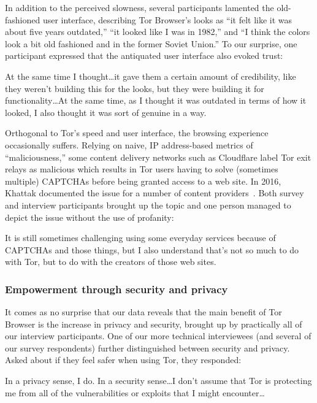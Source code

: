 In addition to the perceived slowness, several participants lamented the
old-fashioned user interface, describing Tor Browser's looks as ``it felt like
it was about five years outdated,'' ``it looked like I was in 1982,'' and ``I
think the colors look a bit old fashioned and in the former Soviet Union.'' To
our surprise, one participant expressed that the antiquated user interface also
evoked trust:

\begin{displayquote}[P02]
At the same time I thought\ldots it gave them a certain amount of credibility,
like they weren't building this for the looks, but they were building it for
functionality\ldots  At the same time, as I thought it was outdated in terms of
how it looked, I also thought it was sort of genuine in a way.
\end{displayquote}

Orthogonal to Tor's speed and user interface, the browsing experience
occasionally suffers.  Relying on naive, IP address-based metrics of
``maliciousness,'' some content delivery networks such as Cloudflare label Tor
exit relays as malicious which results in Tor users having to solve (sometimes
multiple) CAPTCHAs before being granted access to a web site.  In 2016, Khattak
\ea documented the issue for a number of content providers~\cite{Khattak2016a}.
Both survey and interview participants brought up the topic and one person
managed to depict the issue without the use of profanity:

\begin{displayquote}[P06]
It is still sometimes challenging using some everyday services because of
CAPTCHAs and those things, but I also understand that's not so much to do with
Tor, but to do with the creators of those web sites.
\end{displayquote}

\subsubsection{Empowerment through security and privacy}

It comes as no surprise that our data reveals that the main benefit of Tor
Browser is the increase in privacy and security, brought up by practically all
of our interview participants.  One of our more technical interviewees (and
several of our survey respondents) further distinguished between security and
privacy.  Asked about if they feel safer when using Tor, they responded:

\begin{displayquote}[P06]
In a privacy sense, I do. In a security sense\ldots I don't assume that Tor is
protecting me from all of the vulnerabilities or exploits that I might
encounter\ldots
\end{displayquote}

